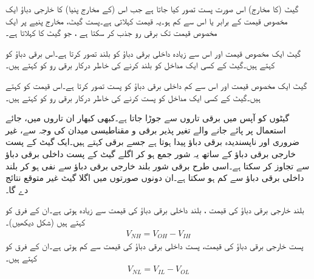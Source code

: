 گیٹ (کا مخارج) اس صورت پست تصور کیا جاتا ہے جب اس (کے مخارج پنیا) کا خارجی دباؤ ایک مخصوص قیمت  کے برابر یا اس سے کم ہو۔یہ قیمت    کہلاتی ہے۔پست گیٹ، مخارج پنیے پر ایک مخصوص قیمت تک برقی رو جذب کر سکتا ہے ، جو گیٹ کا   کہلاتا ہے۔

	
گیٹ ایک مخصوص قیمت اور اس سے زیادہ داخلی برقی دباؤ کو بلند تصور کرتا ہے۔اس برقی دباؤ کو    کہتے ہیں۔گیٹ کے کسی ایک مداخل کو بلند کرنے کی خاطر درکار برقی رو کو    کہتے ہیں۔

گیٹ ایک مخصوص قیمت اور اس سے کم داخلی برقی دباؤ کو پست تصور کرتا ہے۔اس قیمت کو کہتے ہیں۔گیٹ کے کسی ایک مداخل کو پست کرنے کی خاطر درکار برقی رو کو   کہتے ہیں۔
	
 گیٹوں کو آپس میں برقی تاروں سے جوڑا جاتا ہے۔کبھی کبھار ان تاروں میں، جائے استعمال پر پائے جانے والے تغیر پذیر برقی و مقناطیسی میدان کی وجہ سے، غیر ضروری اور ناپسندیدہ برقی دباؤ پیدا ہوتا ہے جسے برقی   کہتے ہیں۔ایک گیٹ کے پست خارجی برقی دباؤ کے ساتھ یہ شور جمع ہو کر اگلے گیٹ کے پست داخلی برقی دباؤ سے تجاوز کر سکتا ہے۔اسی طرح برقی شور بلند خارجی برقی دباؤ سے نفی ہو کر بلند داخلی برقی دباؤ سے کم ہو سکتا ہے۔ان دونوں صورتوں میں اگلا گیٹ غیر متوقع نتائج دے گا۔

 بلند خارجی برقی دباؤ کی قیمت ، بلند داخلی برقی دباؤ کی قیمت سے زیادہ ہوتی ہے۔ان کے فرق کو  کہتے ہیں (شکل  دیکھیں)۔
\begin{align}
V_{NH}=V_{OH}-V_{IH}
\end{align}
 پست خارجی برقی دباؤ کی قیمت، پست داخلی برقی دباؤ کی قیمت سے کم ہوتی ہے۔ان کے فرق کو   کہتے ہیں۔
\begin{align}
V_{NL}=V_{IL}-V_{OL}
\end{align}


